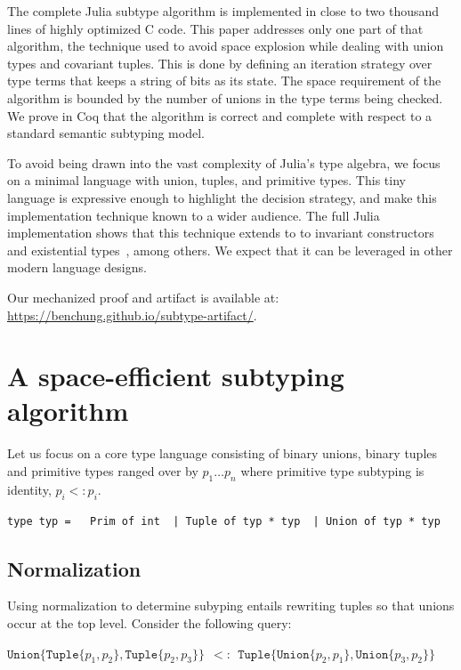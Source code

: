 \documentclass[a4paper,english]{lipics-v2019}
\newcommand{\xt}[1]{\texttt{#1}}
\newcommand{\union}[2]{\xt{Union\{}#1,#2\xt{\}}}
\newcommand{\tuple}[1]{\xt{Tuple\{}#1\xt{\}}}
\begin{document}
The complete Julia subtype algorithm is implemented in close to two thousand
lines of highly optimized C code. This paper addresses only one part of that
algorithm, the technique used to avoid space explosion while dealing with
union types and covariant tuples. This is done by defining an iteration
strategy over type terms that keeps a string of bits as its state. The space
requirement of the algorithm is bounded by the number of unions in the type
terms being checked. We prove in Coq that the algorithm is correct and
complete with respect to a standard semantic subtyping model.

To avoid being drawn into the vast complexity of Julia's type algebra, we
focus on a minimal language with union, tuples, and primitive
types. This tiny language is expressive enough to highlight the decision
strategy, and make this implementation technique known to a wider audience.
The full Julia implementation shows that this technique extends to to invariant constructors and existential
types~\cite{DBLP:NardelliBPCBV18}, among others. We expect that it can be leveraged in
other modern language designs.

\medskip
Our mechanized proof and artifact is available at: \url{https://benchung.github.io/subtype-artifact/}.
\newpage

\section{A space-efficient subtyping algorithm}

Let us focus on a core type language consisting of binary unions, binary
tuples and primitive types ranged over by $p_1 \dots p_n$ where primitive
type subtyping is identity, $p_i <: p_i$.

\medskip
\begin{lstlisting}
type typ =   Prim of int  | Tuple of typ * typ  | Union of typ * typ
\end{lstlisting}
\medskip

\subsection{Normalization}\label{normalize}

Using normalization to determine subyping entails rewriting tuples so that
unions occur at the top level. Consider the following query:

\medskip
$\union{ \tuple{p_1,p_2}}{\tuple{p_2,p_3}} ~~ <:~~  \tuple{ \union{p_2}{p_1}, \union{p_3}{p_2}}$
\medskip
\end{document}
